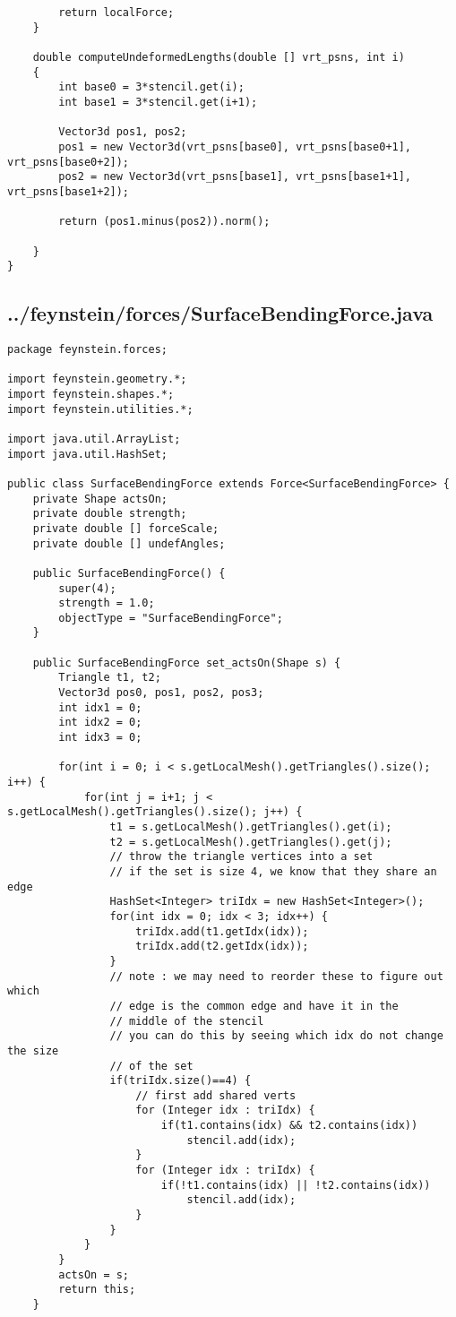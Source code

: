 \begin{lstlisting}
		return localForce;
	}
	
	double computeUndeformedLengths(double [] vrt_psns, int i)
	{
		int base0 = 3*stencil.get(i);
		int base1 = 3*stencil.get(i+1);
		
		Vector3d pos1, pos2;
		pos1 = new Vector3d(vrt_psns[base0], vrt_psns[base0+1], vrt_psns[base0+2]);
		pos2 = new Vector3d(vrt_psns[base1], vrt_psns[base1+1], vrt_psns[base1+2]);
		
		return (pos1.minus(pos2)).norm();
		
	}
}
\end{lstlisting}

\subsection*{../feynstein/forces/SurfaceBendingForce.java}
\begin{lstlisting}
package feynstein.forces;

import feynstein.geometry.*;
import feynstein.shapes.*;
import feynstein.utilities.*;

import java.util.ArrayList;
import java.util.HashSet;

public class SurfaceBendingForce extends Force<SurfaceBendingForce> {
    private Shape actsOn;
    private double strength;
	private double [] forceScale;
	private double [] undefAngles;
	
    public SurfaceBendingForce() {
		super(4);
		strength = 1.0;
		objectType = "SurfaceBendingForce";
    }

    public SurfaceBendingForce set_actsOn(Shape s) {
		Triangle t1, t2;
		Vector3d pos0, pos1, pos2, pos3;
		int idx1 = 0;
		int idx2 = 0;
		int idx3 = 0;

		for(int i = 0; i < s.getLocalMesh().getTriangles().size(); i++) {
			for(int j = i+1; j < s.getLocalMesh().getTriangles().size(); j++) {
				t1 = s.getLocalMesh().getTriangles().get(i);
				t2 = s.getLocalMesh().getTriangles().get(j);
				// throw the triangle vertices into a set
				// if the set is size 4, we know that they share an edge 
				HashSet<Integer> triIdx = new HashSet<Integer>();
				for(int idx = 0; idx < 3; idx++) {
					triIdx.add(t1.getIdx(idx));
					triIdx.add(t2.getIdx(idx));
				}
				// note : we may need to reorder these to figure out which
				// edge is the common edge and have it in the 
				// middle of the stencil
				// you can do this by seeing which idx do not change the size
				// of the set
				if(triIdx.size()==4) {
					// first add shared verts
					for (Integer idx : triIdx) {
						if(t1.contains(idx) && t2.contains(idx))
							stencil.add(idx);
					}
					for (Integer idx : triIdx) {
						if(!t1.contains(idx) || !t2.contains(idx))
							stencil.add(idx);
					}
				}
			}
		}
		actsOn = s;
		return this;
    }


\end{lstlisting}
